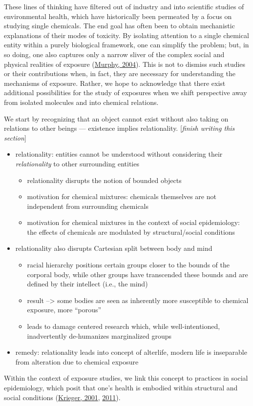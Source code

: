 \documentclass[12pt, twoside]{amherstthesis}
\providecommand{\tightlist}{%
  \setlength{\itemsep}{0pt}\setlength{\parskip}{0pt}}
\begin{document}
These lines of thinking have filtered out of industry and into scientific studies of environmental health, which have historically been permeated by a focus on studying single chemicals. The end goal has often been to obtain mechanistic explanations of their modes of toxicity. By isolating attention to a single chemical entity within a purely biological framework, one can simplify the problem; but, in so doing, one also captures only a narrow sliver of the complex social and physical realities of exposure (\protect\hyperlink{ref-murphy_uncertain_2004}{Murphy, 2004}). This is not to dismiss such studies or their contributions when, in fact, they are necessary for understanding the mechanisms of exposure. Rather, we hope to acknowledge that there exist additional possibilities for the study of exposures when we shift perspective away from isolated molecules and into chemical relations.

We start by recognizing that an object cannot exist without also taking on relations to other beings --- existence implies relationality. {[}\emph{finish writing this section}{]}
\begin{itemize}
\tightlist
\item
  relationality: entities cannot be understood without considering their \emph{relationality} to other surrounding entities
  \begin{itemize}
  \tightlist
  \item
    relationality disrupts the notion of bounded objects
  \item
    motivation for chemical mixtures: chemicals themselves are not independent from surrounding chemicals
  \item
    motivation for chemical mixtures in the context of social epidemiology: the effects of chemicals are modulated by structural/social conditions
  \end{itemize}
\item
  relationality also disrupts Cartesian split between body and mind
  \begin{itemize}
  \tightlist
  \item
    racial hierarchy positions certain groups closer to the bounds of the corporal body, while other groups have transcended these bounds and are defined by their intellect (i.e., the mind)
  \item
    result --\textgreater{} some bodies are seen as inherently more susceptible to chemical exposure, more ``porous''
  \item
    leads to damage centered research which, while well-intentioned, inadvertently de-humanizes marginalized groups
  \end{itemize}
\item
  remedy: relationality leads into concept of alterlife, modern life is inseparable from alteration due to chemical exposure
\end{itemize}
Within the context of exposure studies, we link this concept to practices in social epidemiology, which posit that one's health is embodied within structural and social conditions (\protect\hyperlink{ref-krieger_theories_2001}{Krieger, 2001}, \protect\hyperlink{ref-krieger_epidemiology_2011}{2011}).
\end{document}
